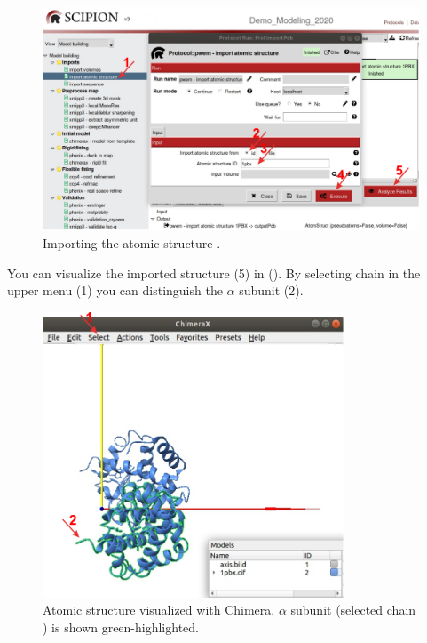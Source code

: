   \begin{figure}[H]
  \centering 
  \captionsetup{width=.9\linewidth} 
  \includegraphics[width=1\textwidth]{Images/Fig10}
  \caption{Importing the atomic structure .}
  \label{fig:import_atomic_structure}
  \end{figure}
  You can visualize the imported structure (5) in \chimera (). By selecting chain  in the \chimera upper menu (1) you can distinguish the  $\alpha$ subunit (2).
  \begin{figure}[H]
  \centering 
  \captionsetup{width=.8\linewidth} 
  \includegraphics[width=0.80\textwidth]{Images/Fig11}
  \caption{Atomic structure  visualized with Chimera.  $\alpha$ subunit (selected chain ) is shown green-highlighted.}
  \label{fig:chimera_visualization_structure}
  \end{figure}
  
